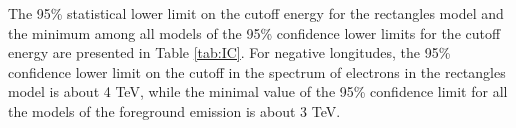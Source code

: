 The 95\% statistical lower limit on the cutoff energy for the rectangles model and the minimum among all models of the 95\% confidence lower limits for the cutoff energy
are presented in Table \ref{tab:IC}.
For negative longitudes,
the 95\% confidence lower limit on the cutoff in the spectrum of electrons in the rectangles model is about 4 TeV,
while the minimal value of the 95\% confidence limit for all the models of the foreground emission is about 3 TeV.

